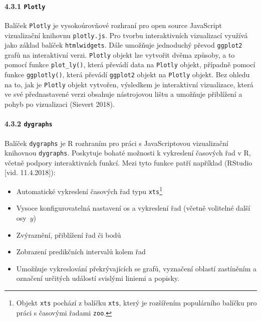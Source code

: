 \documentclass[12pt,]{article}
\providecommand{\tightlist}{%
  \setlength{\itemsep}{0pt}\setlength{\parskip}{0pt}}
\let\oldparagraph\paragraph
\renewcommand{\paragraph}[1]{\oldparagraph{#1}\mbox{}}
\let\rmarkdownfootnote\footnote%
\def\footnote{\protect\rmarkdownfootnote}
\begin{document}
\hypertarget{plotly}{\paragraph{\texorpdfstring{4.3.1
\texttt{Plotly}}{4.3.1 Plotly}}\label{plotly}}

\qquad Balíček \texttt{Plotly} je vysokoúrovňové rozhraní pro open
source JavaScript vizualizační knihovnu \texttt{plotly.js}. Pro tvorbu
interaktivních vizualizací využívá jako základ balíček
\texttt{htmlwidgets}. Dále umožňuje jednoduchý převod \texttt{ggplot2}
grafů na interaktivní verzi. \texttt{Plotly} objekt lze vytvořit dvěma
způsoby, a to pomocí funkce \texttt{plot\_ly()}, která převádí data na
\texttt{Plotly} objekt, případně pomocí funkce \texttt{ggplotly()},
která převádí \texttt{ggplot2} objekt na \texttt{Plotly} objekt. Bez
ohledu na to, jak je \texttt{Plotly} objekt vytvořen, výsledkem je
interaktivní vizualizace, která ve své přednastavené verzi obsahuje
nástrojovou lištu a umožňuje přiblížení a pohyb po vizualizaci (Sievert
2018).

\hypertarget{dygraphs}{\paragraph{\texorpdfstring{4.3.2
\texttt{dygraphs}}{4.3.2 dygraphs}}\label{dygraphs}}

\qquad Balíček \texttt{dygraphs} je R rozhraním pro práci s
JavaScriptovou vizualizační knihovnou \texttt{dygraphs}. Poskytuje
bohaté možnosti k vykreslení časových řad v R, včetně podpory
interaktivních funkcí. Mezi tyto funkce patří například (RStudio {[}vid.
11.4.2018{]}):

\begin{itemize}
\tightlist
\item
  Automatické vykreslení časových řad typu \texttt{xts}\footnote{Objekt
    \texttt{xts} pochází z balíčku \texttt{xts}, který je rozšířením
    populárního balíčku pro práci s časovými řadami \texttt{zoo}.}
\item
  Vysoce konfigurovatelná nastavení os a vykreslení řad (včetně
  volitelné další osy~\(y\))
\item
  Zvýraznění, přiblížení řad či bodů
\item
  Zobrazení predikčních intervalů kolem řad
\item
  Umožňuje vykreslování překrývajících se grafů, vyznačení oblastí
  zastíněním a označení určitých událostí svislými liniemi a popisky.
\end{itemize}
\end{document}
